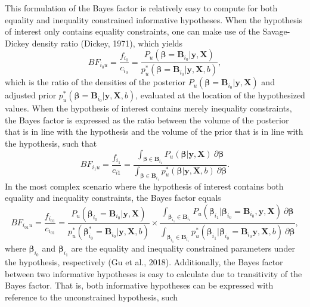 \documentclass[
]{interact}
\begin{document}
This formulation of the Bayes factor is relatively easy to compute for
both equality and inequality constrained informative hypotheses. When
the hypothesis of interest only contains equality constraints, one can
make use of the Savage-Dickey density ratio (Dickey, 1971), which yields
\[
BF_{i_0u} = \frac{f_{i_0}}{c_{i_0}} = \frac{
  P_u(\boldsymbol{\beta} = \boldsymbol{B}_{i_0} | \boldsymbol{y}, \boldsymbol{X})
}{
  p_u^*(\boldsymbol{\beta} = \boldsymbol{B}_{i_0} | \boldsymbol{y}, \boldsymbol{X}, b)
},
\] which is the ratio of the densities of the posterior
\(P_u(\boldsymbol{\beta} = \boldsymbol{B}_{i_0} | \boldsymbol{y}, \boldsymbol{X})\)
and adjusted prior
\(p^*_u(\boldsymbol{\beta} = \boldsymbol{B}_{i_0} | \boldsymbol{y}, \boldsymbol{X}, b)\),
evaluated at the location of the hypothesized values. When the
hypothesis of interest contains merely inequality constraints, the Bayes
factor is expressed as the ratio between the volume of the posterior
that is in line with the hypothesis and the volume of the prior that is
in line with the hypothesis, such that \[
BF_{i_1u} = \frac{f_{i_1}}{c_{i1}} = 
\frac{
  \int_{\boldsymbol{\beta} \in \boldsymbol{B}_{i_1}} P_u(\boldsymbol{\beta} | \boldsymbol{y}, \boldsymbol{X}) ~ \partial \boldsymbol{\beta}
}{
  \int_{\boldsymbol{\beta} \in \boldsymbol{B}_{i_1}} p_u^*(\boldsymbol{\beta} | \boldsymbol{y}, \boldsymbol{X}, b) ~ \partial \boldsymbol{\beta}
}.
\] In the most complex scenario where the hypothesis of interest
contains both equality and inequality constraints, the Bayes factor
equals \[
BF_{i_{01}u} = \frac{f_{i_{01}}}{c_{i_{01}}} = \frac{
  P_u(\boldsymbol{\beta}_{i_0} = \boldsymbol{B}_{i_0} | \boldsymbol{y}, \boldsymbol{X})
}{
  p^*_u(\boldsymbol{\beta}^*_{i_0} = \boldsymbol{B}_{i_0} | \boldsymbol{y}, \boldsymbol{X}, b)
} \times
\frac{
  \int_{\boldsymbol{\beta}_{i_1} \in \boldsymbol{B}_{i_1}} P_u(\boldsymbol{\beta}_{i_1} | \boldsymbol{\beta}_{i_0} = \boldsymbol{B}_{i_0}, \boldsymbol{y}, \boldsymbol{X}) ~ \partial \boldsymbol{\beta}
}{
  \int_{\boldsymbol{\beta}_{i_1} \in \boldsymbol{B}_{i_1}} p^*_u(\boldsymbol{\beta}_{i_1} | \boldsymbol{\beta}_{i_0} = \boldsymbol{B}_{i_0} \boldsymbol{y}, \boldsymbol{X}, b) ~ \partial \boldsymbol{\beta}
},
\] where \(\boldsymbol{\beta}_{i_0}\) and \(\boldsymbol{\beta}_{i_1}\)
are the equality and inequality constrained parameters under the
hypothesis, respectively (Gu et al., 2018). Additionally, the Bayes
factor between two informative hypotheses is easy to calculate due to
transitivity of the Bayes factor. That is, both informative hypotheses
can be expressed with reference to the unconstrained hypothesis, such
\end{document}
